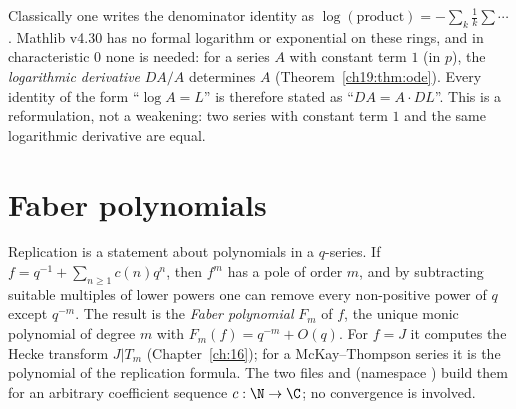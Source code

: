\begin{remark}\label{ch19:rem:logfree}
Classically one writes the denominator identity as $\log(\text{product})=-\sum_{k}\frac1k\sum\cdots$.  Mathlib v4.30
has no formal logarithm or exponential on these rings, and in characteristic $0$ none is needed: for a series $A$ with
constant term $1$ (in $p$), the \emph{logarithmic derivative} $DA/A$ determines $A$ (Theorem~\ref{ch19:thm:ode}).
Every identity of the form ``$\log A=L$'' is therefore stated as ``$DA=A\cdot DL$''.  This is a reformulation, not a
weakening: two series with constant term $1$ and the same logarithmic derivative are equal.
\end{remark}

\section{Faber polynomials}\label{ch19:sec:faber}

Replication is a statement about polynomials in a $q$-series.  If $f=q^{-1}+\sum_{n\ge1}c(n)q^n$, then $f^m$ has a pole
of order $m$, and by subtracting suitable multiples of lower powers one can remove every non-positive power of $q$
except $q^{-m}$.  The result is the \emph{Faber polynomial} $F_m$ of $f$, the unique monic polynomial of degree $m$ with
$F_m(f)=q^{-m}+O(q)$.  For $f=J$ it computes the Hecke transform $J|T_m$ (Chapter~\ref{ch:16}); for a McKay--Thompson
series it is the polynomial of the replication formula.  The two files 
and  (namespace ) build them
for an arbitrary coefficient sequence $c:\N\to\C$; no convergence is involved.

